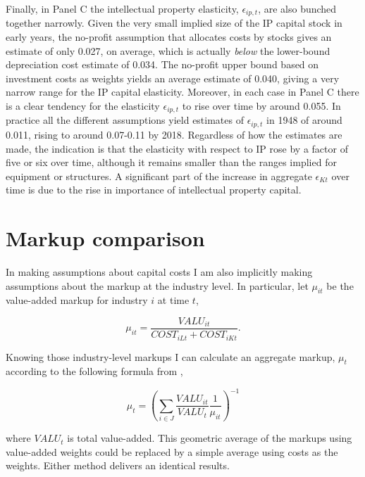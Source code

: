 \documentclass[11pt]{article}
\begin{document}
Finally, in Panel C the intellectual property elasticity, $\epsilon_{ip,t}$, are also bunched together narrowly. Given the very small implied size of the IP capital stock in early years, the no-profit assumption that allocates costs by stocks gives an estimate of only 0.027, on average, which is actually \textit{below} the lower-bound depreciation cost estimate of 0.034. The no-profit upper bound based on investment costs as weights yields an average estimate of 0.040, giving a very narrow range for the IP capital elasticity. Moreover, in each case in Panel C there is a clear tendency for the elasticity $\epsilon_{ip,t}$ to rise over time by around 0.055. In practice all the different assumptions yield estimates of $\epsilon_{ip,t}$ in 1948 of around 0.011, rising to around 0.07-0.11 by 2018. Regardless of how the estimates are made, the indication is that the elasticity with respect to IP rose by a factor of five or six over time, although it remains smaller than the ranges implied for equipment or structures. A significant part of the increase in aggregate $\epsilon_{Kt}$ over time is due to the rise in importance of intellectual property capital.

\section{Markup comparison}
In making assumptions about capital costs I am also implicitly making assumptions about the markup at the industry level. In particular, let $\mu_{it}$ be the value-added markup for industry $i$ at time $t$,

\begin{equation}
	\mu_{it} = \frac{VALU_{it}}{COST_{iLt}+COST_{iKt}}.
\end{equation}

Knowing those industry-level markups I can calculate an aggregate markup, $\mu_t$ according to the following formula from \cite{edmondetal2018},

\begin{equation}
	\mu_t = \left(\sum_{i \in J} \frac{VALU_{it}}{VALU_t}\frac{1}{\mu_{it}} \right)^{-1} \label{EQ_markup}
\end{equation}

where $VALU_t$ is total value-added. This geometric average of the markups using value-added weights could be replaced by a simple average using costs as the weights. Either method delivers an identical results. 
\end{document}
